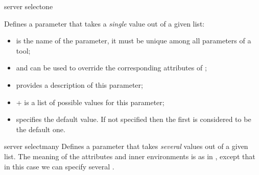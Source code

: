 \bigskip
\xmlstruct
{server}
{selectone}
{%
%
  Defines a parameter that takes a \emph{single} value out of a given
  list:

  \begin{itemize}
  \item {} is the name of the parameter, it must be
    unique among all parameters of a tool;

  \item {} and  can be used
    to override the corresponding attributes of
    ;

  \item {} provides a description of this parameter;

  \item {}+ is a list of possible values for
    this parameter;

  \item {} specifies the default value. If
    not specified then the first  is considered
    to be the default one.


  \end{itemize}
%
}


\bigskip
\xmlstruct
{server}
{selectmany}
{%
%
  Defines a parameter that takes \emph{several} values out of a given
  list. The meaning of the attributes and inner environments is as in
  , except that in this case we can specify
  several  .
%
}


